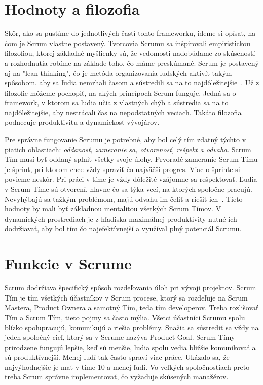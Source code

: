 \documentclass[10pt,slovak,a4paper]{article}
\begin{document}
\section{Hodnoty a filozofia} \label{hodnoty}

Skôr, ako sa pustíme do jednotlivých častí tohto frameworku, ideme si opísať, na čom je Scrum vlastne postavený. Tvorcovia Scrumu sa inšpirovali empiristickou filozofiou, ktorej základné myšlienky sú, že vedomosti nadobúdame zo skúseností a rozhodnutia robíme na základe toho, čo máme preskúmané. Scrum je postavený aj na "lean thinking", čo je metóda organizovania ľudských aktivít takým spôsobom, aby sa ľudia nemrhali časom a sústredili sa na to najdôležitejšie~\cite{schwaber2020scrum}. Už z filozofie môžeme pochopiť, na akých princípoch Scrum funguje. Jedná sa o framework, v ktorom sa ľudia učia z vlastných chýb a sústredia sa na to najdôležitejšie, aby nestrácali čas na nepodstatných veciach. Takáto filozofia podnecuje produktivitu a dynamickosť vývojárov.

Pre správne fungovanie Scrumu je potrebné, aby bol celý tím zdatný týchto v piatich oblastiach: \emph{oddanosť, zameranie sa, otvorenosť, rešpekt a odvaha}. Scrum Tím musí byť oddaný splniť všetky svoje úlohy. Prvoradé zameranie Scrum Tímu je šprint, pri ktorom chce vždy spraviť čo najväčší progres. Viac o šprinte si povieme neskôr. Pri práci v tíme je vždy dôležité vzájomne sa rešpektovať. Ľudia v Scrum Tíme sú otvorení, hlavne čo sa týka vecí, na ktorých spoločne pracujú. Nevyhýbajú sa ťažkým problémom, majú odvahu im čeliť a riešiť ich~\cite{schwaber2020scrum}. Tieto hodnoty by mali byť základnou mentalitou všetkých Scrum Tímov. V dynamických prostrediach je z hľadiska maximálnej produktivity nutné ich dodržiavať, aby bol tím čo najefektívnejší a využíval plný potenciál Scrumu. 

\section{Funkcie v Scrume} \label{funkcie}

Scrum dodržiava špecifický spôsob rozdeľovania úloh pri vývoji projektov. Scrum Tím je tím všetkých účastníkov v Scrum procese, ktorý sa rozdeľuje na Scrum Mastera, Product Ownera a samotný Tím, teda tím developerov. Treba rozlišovať Tím a Scrum Tím, tieto pojmy sa často mýlia. Všetci účastníci Scrumu spolu blízko spolupracujú, komunikujú a riešia problémy. Snažia sa sústrediť sa vždy na jeden spoločný cieľ, ktorý sa v Scrume nazýva Product Goal. Scrum Tímy prirodzene fungujú lepšie, keď sú menšie, ľudia spolu vedia bližšie komunikovať a sú produktívnejší. Menej ľudí tak často spraví viac práce. Ukázalo sa, že najvýhodnejšie je mať v tíme 10 a menej ľudí. Vo veľkých spoločnostiach preto treba Scrum správne implementovať, čo vyžaduje skúsených manažérov.
\end{document}
